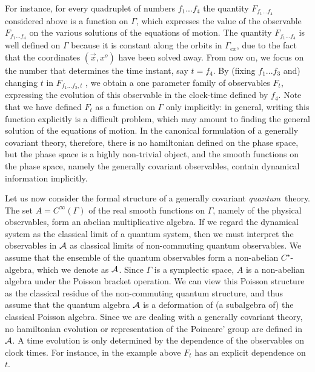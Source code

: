For instance, for every quadruplet of numbers $f_1 ... f_4$ the
quantity $ F_{f_1 ... f_4}$ considered above is a function on
$\Gamma$, which expresses the value of the observable $F_{f_1
... f_4}$ on the various solutions of the equations of motion.
The quantity $F_{f_1 ... f_4}$ is well defined on $\Gamma$
because it is constant along the orbits in $\Gamma_{ex}$, due to
the fact that the coordinates $(\vec x, x^o)$ have been solved
away.  From now on, we focus on the number that
determines the time instant, say $t = f_4$.  By (fixing $f_1...f_3$
and) changing $t$ in
$F_{f_1 ... f_3, t}$ , we obtain a one parameter family of
observables $F_{t}$,
expressing the evolution of this observable in the clock-time
defined by $f_4$.   Note that we have defined  $F_{t}$ as a
function on $\Gamma$ only implicitly: in general, writing this
function explicitly is a difficult problem, which may amount to
finding the general solution of the equations of motion.   In the
canonical formulation of a generally covariant theory, therefore,
there is no hamiltonian defined on the phase space, but the phase
space is a highly non-trivial object, and the smooth functions on
the phase space, namely the generally covariant observables,
contain dynamical information implicitly.

Let us now consider the formal structure of a generally covariant
{\it quantum\,} theory.  The set ${A} = C^\infty(\Gamma)$ of the
real
smooth functions on $\Gamma$, namely of the physical
observables, form an abelian multiplicative algebra.   If we
regard the dynamical system as the classical limit of a quantum
system, then we must interpret the observables in
$\cal A$ as classical limits of non-commuting quantum
observables.   We assume that the
ensemble of the quantum observables form a non-abelian
$C^\star$-algebra, which we denote as $\cal A$.   Since
$\Gamma$ is a symplectic space, ${A}$ is a non-abelian algebra
under the
Poisson bracket operation.  We can view this Poisson structure as
the classical residue of the non-commuting quantum structure,
and thus assume that the quantum algebra $\cal A$ is a
deformation of  (a subalgebra of) the classical Poisson algebra.
Since we are dealing with a generally covariant theory, no
hamiltonian evolution or representation of the Poincare' group are
defined in $\cal A$.   A time evolution is only determined by the
dependence of the observables on clock times. For instance, in the
example above $F_{t}$ has an explicit dependence on $t$.


